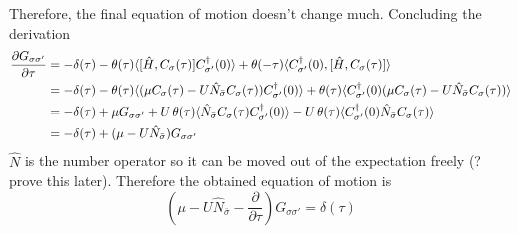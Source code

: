 \documentclass{article}
\begin{document}
Therefore, the final equation of motion doesn't change much. Concluding the derivation
\begin{align*}
\frac{\partial G_{\sigma\sigma'}}{\partial \tau} &= -\delta(\tau) -\operatorname{\theta}(\tau)\langle [\hat{H}, C_\sigma(\tau)]C_{\sigma'}^\dagger(0) \rangle + \operatorname{\theta}(-\tau)\langle C_{\sigma'}^\dagger(0),[\hat{H}, C_\sigma(\tau)] \rangle  \\
&= -\delta(\tau) - \operatorname{\theta}(\tau)\langle (\mu C_\sigma(\tau) - U\hat{N}_{\bar{\sigma}}C_\sigma(\tau))C_{\sigma'}^\dagger(0) \rangle + \operatorname{\theta}(\tau)\langle C_{\sigma'}^\dagger(0) (\mu C_\sigma(\tau) - U\hat{N}_{\bar{\sigma}}C_\sigma(\tau)) \rangle \\
&= -\delta(\tau) +\mu G_{\sigma\sigma'} + U\operatorname{\theta}(\tau)\langle \hat{N}_{\bar{\sigma}}C_\sigma(\tau)C_{\sigma'}^\dagger(0) \rangle - U\operatorname{\theta}(\tau)\langle C_{\sigma'}^\dagger(0)\hat{N}_{\bar{\sigma}}C_\sigma(\tau) \rangle \\
&= -\delta(\tau) + (\mu - U\hat{N}_{\bar{\sigma}}) G_{\sigma\sigma'} 
\end{align*}
$\hat{N}$ is the number operator so it can be moved out of the expectation freely (? prove this later). Therefore the obtained equation of motion is 
\begin{equation*} (\mu - U\hat{N}_{\bar{\sigma}} - \frac{\partial}{\partial \tau})G_{\sigma\sigma'} = \delta(\tau) \end{equation*}
\end{document}
